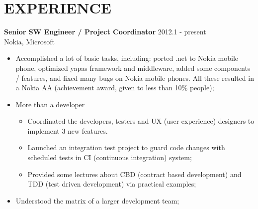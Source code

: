
\section{EXPERIENCE}
\textbf{Senior SW Engineer / Project Coordinator} \hfill 2012.1 - present \\
        Nokia, Microsoft
        \begin{itemize}  \itemsep -2pt %
        \item Accomplished a lot of basic tasks, including:
            ported .net to Nokia mobile phone, optimized yapas framework and middleware, added some components / features,
            and fixed many bugs on Nokia mobile phones.
        All these resulted in a Nokia AA (achievement award, given to less than 10\% people);
        \item More than a developer 
            \begin{itemize}  \itemsep -2pt
                \item Coordinated the developers, testers and UX (user experience) designers to implement 3 new features.
                \item Launched an integration test project to guard code changes
                with scheduled tests in CI (continuous integration) system;
                \item Provided some lectures about CBD (contract based development) and
                TDD (test driven development) via practical examples;
            \end{itemize}
        \item Understood the matrix of a larger development team;
        \end{itemize}

